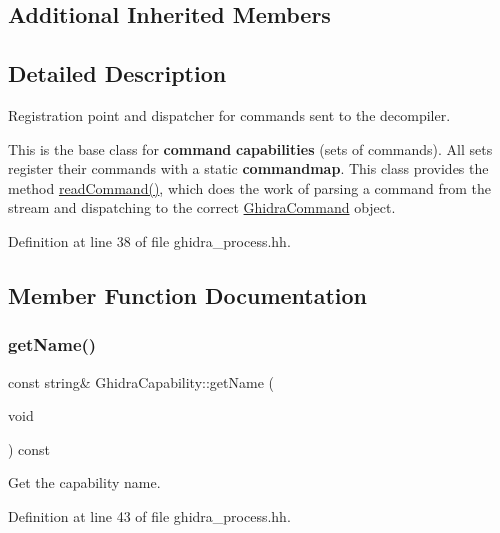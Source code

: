 \subsection*{Additional Inherited Members}


\subsection{Detailed Description}
Registration point and dispatcher for commands sent to the decompiler. 

This is the base class for {\bfseries{command}} {\bfseries{capabilities}} (sets of commands). All sets register their commands with a static {\bfseries{commandmap}}. This class provides the method \mbox{\hyperlink{class_ghidra_capability_a778472d4da43daeda23553684f87ad80}{read\+Command()}}, which does the work of parsing a command from the stream and dispatching to the correct \mbox{\hyperlink{class_ghidra_command}{Ghidra\+Command}} object. 

Definition at line 38 of file ghidra\+\_\+process.\+hh.



\subsection{Member Function Documentation}
\mbox{\label{class_ghidra_capability_a5928ab9d0dd3212f9f7a732c62a3e390}} 
\subsubsection{\texorpdfstring{getName()}{getName()}}
{\footnotesize\ttfamily const string\& Ghidra\+Capability\+::get\+Name (\begin{DoxyParamCaption}\item[{void}]{ }\end{DoxyParamCaption}) const\hspace{0.3cm}{\ttfamily [inline]}}



Get the capability name. 



Definition at line 43 of file ghidra\+\_\+process.\+hh.

\mbox{\label{class_ghidra_capability_a778472d4da43daeda23553684f87ad80}} 
